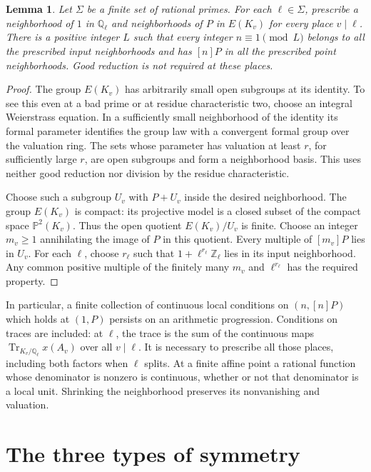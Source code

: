 \documentclass[11pt,a4paper]{article}
\newtheorem{lemma}[theorem]{Lemma}
\newcommand{\Q}{\mathbb Q}\newcommand{\Z}{\mathbb Z}
\DeclareMathOperator{\Tr}{Tr}
\begin{document}
\begin{lemma}\label{lem:progression}
Let $\Sigma$ be a finite set of rational primes. For each
$\ell\in\Sigma$, prescribe a neighborhood of $1$ in $\Q_\ell$
and neighborhoods of $P$ in $E(K_v)$ for every place $v\mid\ell$.
There is a positive integer $L$ such that every integer
$n\equiv1\pmod L$ belongs to all the prescribed input
neighborhoods and has $[n]P$ in all the prescribed point
neighborhoods. Good reduction is not required at these places.
\end{lemma}
\begin{proof}
The group $E(K_v)$ has arbitrarily small open subgroups at its
identity. To see this even at a bad prime or at residue
characteristic two, choose an integral Weierstrass equation.
In a sufficiently small neighborhood of the identity its formal
parameter identifies the group law with a convergent formal group
over the valuation ring\cite[Chapters IV and VII]{Silverman}.
The sets whose parameter has valuation
at least $r$, for sufficiently large $r$, are open subgroups and
form a neighborhood basis. This uses neither good reduction nor
division by the residue characteristic.

Choose such a subgroup $U_v$ with $P+U_v$ inside the desired
neighborhood. The group $E(K_v)$ is compact: its projective
model is a closed subset of the compact space
$\mathbb P^2(K_v)$. Thus the open quotient $E(K_v)/U_v$ is finite.
Choose an integer $m_v\ge1$ annihilating the image of $P$ in
this quotient. Every multiple of $[m_v]P$ lies in $U_v$.
For each $\ell$, choose $r_\ell$ such that
$1+\ell^{r_\ell}\Z_\ell$ lies in its input neighborhood.
Any common positive multiple of the finitely many $m_v$ and
$\ell^{r_\ell}$ has the required property.
\end{proof}

In particular, a finite collection of continuous local conditions
on $(n,[n]P)$ which holds at $(1,P)$ persists on an arithmetic
progression. Conditions on traces are included: at $\ell$, the
trace is the sum of the continuous maps
$\Tr_{K_v/\Q_\ell}x(A_v)$ over all $v\mid\ell$.
It is necessary to prescribe all those places, including both
factors when $\ell$ splits. At a finite affine point a rational
function whose denominator is nonzero is continuous, whether or
not that denominator is a local unit. Shrinking the neighborhood
preserves its nonvanishing and valuation.

\section{The three types of symmetry}
\end{document}
